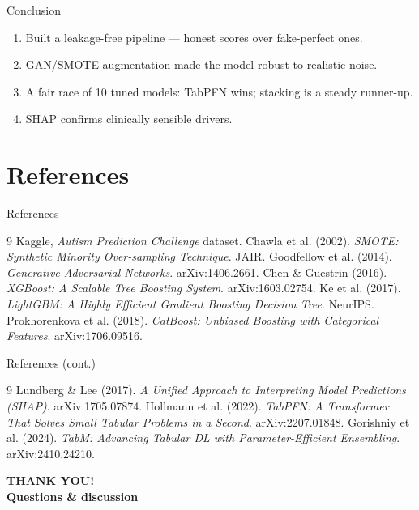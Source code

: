 \documentclass[aspectratio=169]{beamer}
\begin{document}
\begin{frame}{Conclusion}
\begin{enumerate}
    \item Built a leakage-free pipeline --- honest scores over fake-perfect ones.
    \item GAN/SMOTE augmentation made the model robust to realistic noise.
    \item A fair race of 10 tuned models: TabPFN wins; stacking is a steady runner-up.
    \item SHAP confirms clinically sensible drivers.
\end{enumerate}
\end{frame}

\section*{References}

\begin{frame}{References}
\footnotesize
\begin{thebibliography}{9}
 Kaggle, \emph{Autism Prediction Challenge} dataset.
 Chawla et al. (2002). \emph{SMOTE: Synthetic Minority Over-sampling Technique}. JAIR.
 Goodfellow et al. (2014). \emph{Generative Adversarial Networks}. arXiv:1406.2661.
 Chen \& Guestrin (2016). \emph{XGBoost: A Scalable Tree Boosting System}. arXiv:1603.02754.
 Ke et al. (2017). \emph{LightGBM: A Highly Efficient Gradient Boosting Decision Tree}. NeurIPS.
 Prokhorenkova et al. (2018). \emph{CatBoost: Unbiased Boosting with Categorical Features}. arXiv:1706.09516.
\end{thebibliography}
\end{frame}

\begin{frame}{References (cont.)}
\footnotesize
\begin{thebibliography}{9}
\setcounter{enumiv}{6}
 Lundberg \& Lee (2017). \emph{A Unified Approach to Interpreting Model Predictions (SHAP)}. arXiv:1705.07874.
 Hollmann et al. (2022). \emph{TabPFN: A Transformer That Solves Small Tabular Problems in a Second}. arXiv:2207.01848.
 Gorishniy et al. (2024). \emph{TabM: Advancing Tabular DL with Parameter-Efficient Ensembling}. arXiv:2410.24210.
\end{thebibliography}
\end{frame}

{
\begin{frame}
  \hspace*{0.36\paperwidth}%
  \begin{minipage}{0.60\paperwidth}
    \centering
    {\color{HUSTRed}\bfseries\fontsize{30pt}{38pt}\selectfont THANK YOU!}\\[10pt]
    {\color{HUSTRed}\bfseries\fontsize{16pt}{20pt}\selectfont Questions \& discussion}
  \end{minipage}
\end{frame}
}
\end{document}
